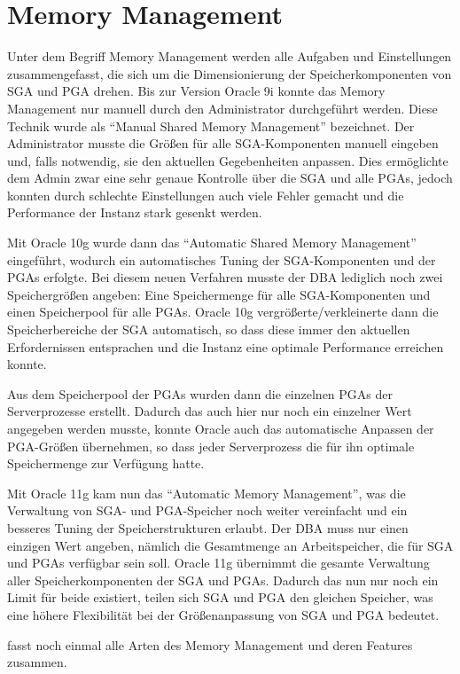       \section{Memory Management}
        \label{memorymanagement}
        Unter dem Begriff Memory Management werden alle Aufgaben und Einstellungen zusammengefasst, die sich um die Dimensionierung der Speicherkomponenten von SGA und PGA drehen. Bis zur Version Oracle 9i konnte das Memory Management nur manuell durch den Administrator durchgeführt werden. Diese Technik wurde als \enquote{Manual Shared Memory Management} bezeichnet. Der Administrator musste die Größen für alle SGA-Komponenten manuell eingeben und, falls notwendig, sie den aktuellen Gegebenheiten anpassen. Dies ermöglichte dem Admin zwar eine sehr genaue Kontrolle über die SGA und alle PGAs, jedoch konnten durch schlechte Einstellungen auch viele Fehler gemacht und die Performance der Instanz stark gesenkt werden.

        Mit Oracle 10g wurde dann das \enquote{Automatic Shared Memory Management} eingeführt, wodurch ein automatisches Tuning der SGA-Komponenten und der PGAs erfolgte. Bei diesem neuen Verfahren musste der DBA lediglich noch zwei Speichergrößen angeben: Eine Speichermenge für alle SGA-Komponenten und einen Speicherpool für alle PGAs. Oracle 10g vergrößerte/verkleinerte dann die Speicherbereiche der SGA automatisch, so dass diese immer den aktuellen Erfordernissen entsprachen und die Instanz eine optimale Performance erreichen konnte.

        Aus dem Speicherpool der PGAs wurden dann die einzelnen PGAs der Serverprozesse erstellt. Dadurch das auch hier nur noch ein einzelner Wert angegeben werden musste, konnte Oracle auch das automatische Anpassen der PGA-Größen übernehmen, so dass jeder Serverprozess die für ihn optimale Speichermenge zur Verfügung hatte.

        Mit Oracle 11g kam nun das \enquote{Automatic Memory Management}, was die Verwaltung von SGA- und PGA-Speicher noch weiter vereinfacht und ein besseres Tuning der Speicherstrukturen erlaubt. Der DBA muss nur einen einzigen Wert angeben, nämlich die Gesamtmenge an Arbeitspeicher, die für SGA und PGAs verfügbar sein soll. Oracle 11g übernimmt die gesamte Verwaltung aller Speicherkomponenten der SGA und PGAs. Dadurch das nun nur noch ein Limit für beide existiert, teilen sich SGA und PGA den gleichen Speicher, was eine höhere Flexibilität bei der Größenanpassung von SGA und PGA bedeutet.

         fasst noch einmal alle Arten des Memory Management und deren Features zusammen.

